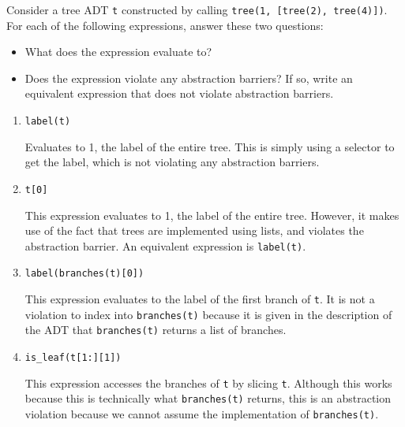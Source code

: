 \question
Consider a tree ADT \texttt{t} constructed by calling \texttt{tree(1, [tree(2),
tree(4)])}.  For each of the following expressions, answer these two questions:

\begin{itemize}
\item What does the expression evaluate to?
\item Does the expression violate any abstraction barriers? If so, write an
equivalent expression that does not violate abstraction barriers.
\end{itemize}

\begin{enumerate}
\item \texttt{label(t)}
\begin{solution}[0.20in]
Evaluates to 1, the label of the entire tree. This is simply using a selector
to get the label, which is not violating any abstraction barriers.
\end{solution}
\item \texttt{t[0]}
\begin{solution}[0.20in]
This expression evaluates to 1, the label of the entire tree. However, it makes
use of the fact that trees are implemented using lists, and violates the
abstraction barrier. An equivalent expression is \texttt{label(t)}.
\end{solution}
\item \texttt{label(branches(t)[0])}
\begin{solution}[0.20in]
This expression evaluates to the label of the first branch of \texttt{t}.  It
is not a violation to index into \texttt{branches(t)} because it is given in
the description of the ADT that \texttt{branches(t)} returns a list of
branches.
\end{solution}
\item \texttt{is\_leaf(t[1:][1])}
\begin{solution}[0.20in]
This expression accesses the branches of \texttt{t} by slicing \texttt{t}.
Although this works because this is technically what \texttt{branches(t)}
returns, this is an abstraction violation because we cannot assume the
implementation of \texttt{branches(t)}.


\end{solution}
\end{enumerate}
